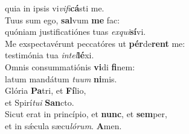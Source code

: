 \oddverse quia in ipsis vi\textit{vi}\textit{fi}\textbf{cá}sti me.\\
\evenverse Tuus sum ego, \textbf{sal}vum \textbf{me} fac:~\*\\
\evenverse quóniam justificatiónes tuas \textit{ex}\textit{qui}\textbf{sí}vi.\\
\oddverse Me exspectavérunt peccatóres ut \textbf{pér}de\textbf{rent} me:~\*\\
\oddverse testimónia tua \textit{in}\textit{tel}\textbf{lé}xi.\\
\evenverse Omnis consummatiónis \textbf{vi}di \textbf{fi}nem:~\*\\
\evenverse latum mandátum \textit{tu}\textit{um} \textbf{ni}mis.\\
\oddverse Glória \textbf{Pa}tri, et \textbf{Fí}lio,~\*\\
\oddverse et Spirí\textit{tu}\textit{i} \textbf{San}cto.\\
\evenverse Sicut erat in princípio, et \textbf{nunc}, et \textbf{sem}per,~\*\\
\evenverse et in sǽcula sæcu\textit{ló}\textit{rum}. \textbf{A}men.\\
